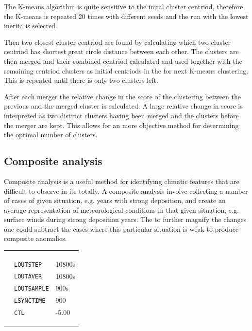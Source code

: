 The K-means algorithm is quite sensitive to the inital cluster centriod, therefore the K-means is repeated 20 times with different seeds and the run with the lowest inertia is selected. 

Then two closest cluster centriod are found by calculating which two cluster centriod has shortest great circle distance between each other. The clusters are then merged and their combined centriod calculated and used together with the remaining centriod clusters as initial centriods in the for next K-means clustering. This is repeated until there is only two clusters left. 

After each merger the relative change in the score of the clustering between the previous and the merged cluster is calculated. A large relative change in score is interpreted as two distinct clusters having been merged and the clusters before the merger are kept. This allows for an more objective method for determining the optimal number of clusters.    

\subsection{Composite analysis}

Composite analysis is a useful method for identifying climatic features that are difficult to observe in its totally. A composite analysis involve collecting a number of cases of given situation, e.g. years with strong deposition, and create an average representation of meteorological conditions in that given situation, e.g. surface winds during strong deposition years. The to further magnify the changes one could subtract the cases where this particular situation is weak to produce composite anomalies.      

\begin{table}[htpb]
\centering
\begin{tabular}{lll}
 &  &  \\
 &  &  \\
\rowcolor[HTML]{EFEFEF} 
 &  & \\
 & \verb|LOUTSTEP| & 10800s \\
\rowcolor[HTML]{EFEFEF} 
 & \verb|LOUTAVER| & 10800s \\
 & \verb|LOUTSAMPLE| & 900s  \\
\rowcolor[HTML]{EFEFEF} 
 & \verb|LSYNCTIME| & 900  \\
 & \verb|CTL|  & -5.00 \\
\rowcolor[HTML]{EFEFEF} 
 &  &  \\
 &  &  \\
\rowcolor[HTML]{EFEFEF} 
 &  & 
\end{tabular}
\end{table}


